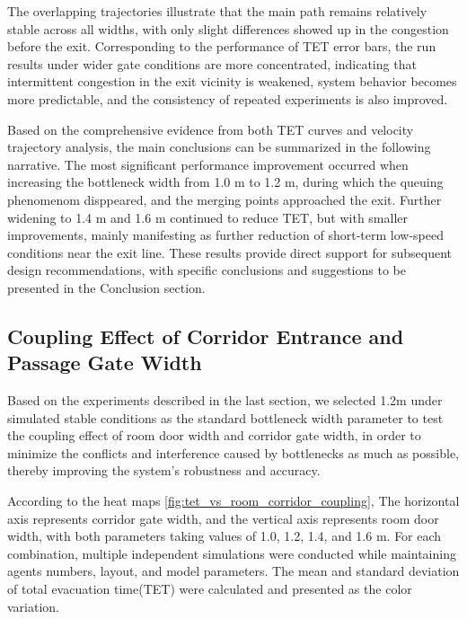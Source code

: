 The overlapping trajectories illustrate that the main path remains relatively stable across all widths, with only slight differences showed up in the congestion before the exit. Corresponding to the performance of TET error bars, the run results under wider gate conditions are more concentrated, indicating that intermittent congestion in the exit vicinity is weakened, system behavior becomes more predictable, and the consistency of repeated experiments is also improved.

Based on the comprehensive evidence from both TET curves and velocity trajectory analysis, the main conclusions can be summarized in the following narrative. The most significant performance improvement occurred when increasing the bottleneck width from 1.0 m to 1.2 m, during which the queuing phenomenom disppeared, and the merging points approached the exit. Further widening to 1.4 m and 1.6 m continued to reduce TET, but with smaller improvements, mainly manifesting as further reduction of short-term low-speed conditions near the exit line.  These results provide direct support for subsequent design recommendations, with specific conclusions and suggestions to be presented in the Conclusion section.

\subsection{Coupling Effect of Corridor Entrance and Passage Gate Width}
Based on the experiments described in the last section, we selected 1.2m under simulated stable conditions as the standard bottleneck width parameter to test the coupling effect of room door width and corridor gate width, in order to minimize the conflicts and interference caused by bottlenecks as much as possible, thereby improving the system's robustness and accuracy.

According to the heat maps \ref{fig:tet_vs_room_corridor_coupling}, The horizontal axis represents corridor gate width, and the vertical axis represents room door width, with both parameters taking values of 1.0, 1.2, 1.4, and 1.6 m. For each combination, multiple independent simulations were conducted while maintaining agents numbers, layout, and model parameters. The mean and standard deviation of total evacuation time(TET) were calculated and presented as the color variation.


